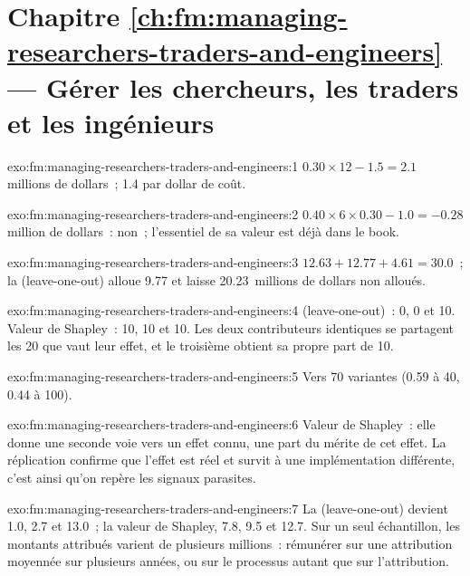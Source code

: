 \section*{Chapitre \ref{ch:fm:managing-researchers-traders-and-engineers} --- Gérer les chercheurs, les traders et les ingénieurs}

\begin{solution}{exo:fm:managing-researchers-traders-and-engineers:1}
$0.30\times12-1.5=2.1$ millions de dollars~; 1.4 par dollar de coût.
\end{solution}

\begin{solution}{exo:fm:managing-researchers-traders-and-engineers:2}
$0.40\times6\times0.30-1.0=-0.28$ million de dollars~: non~; l'essentiel de sa valeur est déjà dans le book.
\end{solution}

\begin{solution}{exo:fm:managing-researchers-traders-and-engineers:3}
$12.63+12.77+4.61=30.0$~; la  (leave-one-out) alloue 9.77 et laisse 20.23~millions de dollars non alloués.
\end{solution}

\begin{solution}{exo:fm:managing-researchers-traders-and-engineers:4}
 (leave-one-out)~: 0, 0 et 10. Valeur de Shapley~: 10, 10 et 10. Les deux contributeurs identiques se partagent les 20 que vaut leur effet, et le troisième obtient
sa propre part de 10.
\end{solution}

\begin{solution}{exo:fm:managing-researchers-traders-and-engineers:5}
Vers 70 variantes (0.59 à 40, 0.44 à 100).
\end{solution}

\begin{solution}{exo:fm:managing-researchers-traders-and-engineers:6}
Valeur de Shapley~: elle donne une seconde voie vers un effet connu, une part du mérite de cet effet. La réplication confirme que l'effet est réel et survit à une
implémentation différente, c'est ainsi qu'on repère les signaux parasites.
\end{solution}

\begin{solution}{exo:fm:managing-researchers-traders-and-engineers:7}
La  (leave-one-out) devient 1.0, 2.7 et 13.0~; la valeur de Shapley, 7.8, 9.5 et 12.7. Sur un seul échantillon, les montants attribués varient de plusieurs millions~: rémunérer sur une attribution moyennée
sur plusieurs années, ou sur le processus autant que sur l'attribution.
\end{solution}

